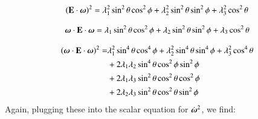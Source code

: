 \documentclass[preprint,12pt,authoryear]{elsarticle}
\newcommand{\mitbf}[1]{\hbox{\mathversion{bold}$#1$}}
\begin{document}
\begin{equation}
\left(\mathbf{E}\cdot \mitbf{\omega}\right)^2 = \lambda_1^2 \sin^2{\theta} \cos^2{\phi} + \lambda_2^2 \sin^2{\theta} \sin^2{\phi} + \lambda_3^2 \cos^2{\theta}
\end{equation}

\begin{equation}
\mitbf{\omega} \cdot \mathbf{E} \cdot \mitbf{\omega} = 
\lambda_1 \sin^2{\theta} \cos^2{\phi} + \lambda_2 \sin^2{\theta} \sin^2{\phi} + \lambda_3 \cos^2{\theta}
\end{equation}

\begin{equation}
\begin{aligned}
\left(\mitbf{\omega} \cdot \mathbf{E} \cdot \mitbf{\omega} \right)^2 =  
&\lambda_1^2 \sin^4{\theta} \cos^4{\phi} + 
\lambda_2^2 \sin^4{\theta} \sin^4{\phi} +
\lambda_3^2 \cos^4{\theta} \\
&+ 2 \lambda_1 \lambda_2 \sin^4{\theta} \cos^2{\phi}\sin^2{\phi} \\ 
&+ 2 \lambda_1 \lambda_3 \sin^2{\theta} \cos^2{\theta} \cos^2{\phi} \\
&+ 2 \lambda_2 \lambda_3 \sin^2{\theta} \cos^2{\theta} \sin^2{\phi} \\ 
\end{aligned}
\end{equation}
Again, plugging these into the scalar equation for $\dot{\mitbf{\omega}}^2$, we find:
\end{document}
